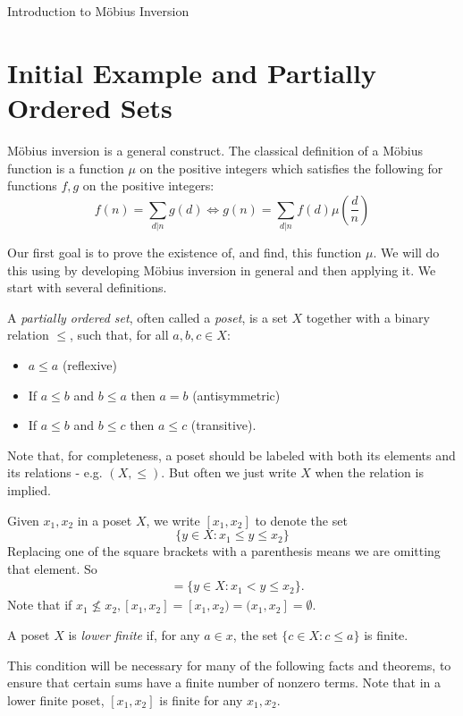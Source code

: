 \documentclass[12pt]{pom_thesis}
\begin{document}
\begin{chapter}{Introduction to M\"obius Inversion}
\section{Initial Example and Partially Ordered Sets}
M\"obius inversion is a general construct. The classical definition of a M\"obius function is a function $\mu$ on the positive integers which satisfies the following for functions $f,g$ on the positive integers:
\begin{equation}\label{init_mob} 
f(n) = \sum_{d | n} g(d) \iff g(n) = \sum_{d | n}  f(d)\mu\left(\frac dn\right)
\end{equation}

Our first goal is to prove the existence of, and find, this function $\mu$. We will do this using by developing M\"obius inversion in general and then applying it. We start with several definitions.

\begin{defn}
A \emph{partially ordered set}, often called a \emph{poset}, is a set $X$ together with a binary relation $\leq$, such that, for all $a,b,c \in X$:
\begin{itemize}
\item $a \leq a$ (reflexive)
\item If $a \leq b$ and $b \leq a$ then $a = b$ (antisymmetric)
\item If $a \leq b$ and $b \leq c$ then $a \leq c$ (transitive).
\end{itemize}
\end{defn}
Note that, for completeness, a poset should be labeled with both its elements and its relations - e.g. $(X, \leq)$. But often we just write $X$ when the relation is implied.
\begin{rmk}
Given $x_1, x_2$ in a poset $X$, we write $[x_1, x_2]$ to denote the set 
\[
\{y \in X: x_1 \leq y \leq x_2\}
\]
Replacing one of the square brackets with a parenthesis means we are omitting that element. So
\begin{align*}
[x_1, x_2) &= \{y \in X: x_1 \leq y < x_2\},\\
(x_1, x_2] &= \{y \in X: x_1 < y \leq x_2\}.
\end{align*}
Note that if $x_1 \nleq x_2, [x_1, x_2] = [x_1, x_2) = (x_1, x_2]= \emptyset.$
\end{rmk}
\begin{defn}
A poset $X$ is \emph{lower finite} if, for any $a \in x$, the set $\{ c \in X: c \leq a\}$ is finite.
\end{defn}
This condition will be necessary for many of the following facts and theorems, to ensure that certain sums have a finite number of nonzero terms. Note that in a lower finite poset, $[x_1, x_2]$ is finite for any $x_1, x_2$.


\end{chapter}
\end{document}
